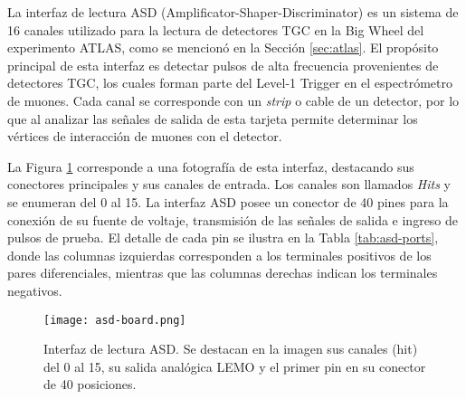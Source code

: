La interfaz de lectura ASD (Amplificator-Shaper-Discriminator)\cite{1999ATLASICs} es un sistema de 16 canales utilizado para la lectura de detectores TGC en la Big Wheel del experimento ATLAS, como se mencionó en la Sección \ref{sec:atlas}. El propósito principal de esta interfaz es detectar pulsos de alta frecuencia provenientes de detectores TGC, los cuales forman parte del Level-1 Trigger en el espectrómetro de muones. Cada canal se corresponde con un \textit{strip} o cable de un detector, por lo que al analizar las señales de salida de esta tarjeta permite determinar los vértices de interacción de muones con el detector.

La Figura \ref{img:asd-board} corresponde a una fotografía de esta interfaz, destacando sus conectores principales y sus canales de entrada. Los canales son llamados \textit{Hits} y se enumeran del 0 al 15. La interfaz ASD posee un conector de 40 pines para la conexión de su fuente de voltaje, transmisión de las señales de salida  e ingreso de pulsos de prueba. El detalle de cada pin se ilustra en la Tabla \ref{tab:asd-ports}, donde las columnas izquierdas corresponden a los terminales positivos de los pares diferenciales, mientras que las columnas derechas indican los terminales negativos.  %

\begin{figure}[h]
	\centering
	\texttt{[image: asd-board.png]}
	\caption{Interfaz de lectura ASD. Se destacan en la imagen sus canales (hit) del 0 al 15, su salida analógica LEMO y el primer pin en su conector de 40 posiciones.}
	\label{img:asd-board}
\end{figure}

